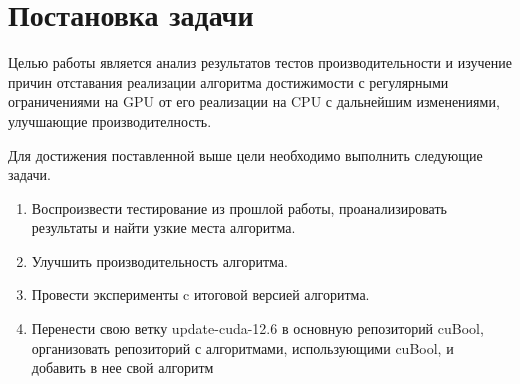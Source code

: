 
\section{Постановка задачи}
\label{sec:task}

Целью работы является анализ результатов тестов производительности и изучение причин отставания реализации алгоритма достижимости с регулярными ограничениями на GPU от его реализации на CPU с дальнейшим изменениями, улучшающие производителность.

Для достижения поставленной выше цели необходимо выполнить следующие задачи.
\begin{enumerate}
    \item Воспроизвести тестирование из прошлой работы, проанализировать результаты и найти узкие места алгоритма.
    \item Улучшить производительность алгоритма.
    \item Провести эксперименты c итоговой версией алгоритма.
    \item Перенести свою ветку update-cuda-12.6 в основную репозиторий cuBool, организовать репозиторий с алгоритмами, использующими cuBool, и добавить в нее свой алгоритм
\end{enumerate}
